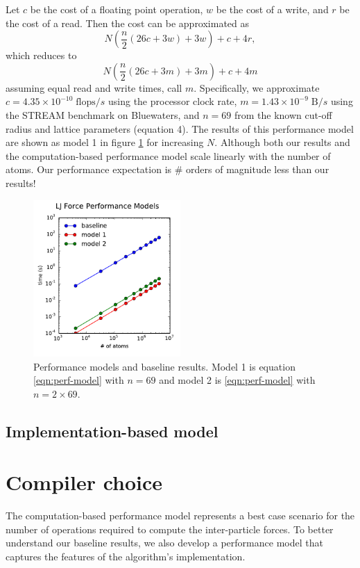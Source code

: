 \documentclass[12pt]{article}
\begin{document}
\noindent Let $c$ be the cost of a floating point operation, $w$ be the cost of a write, 
and $r$ be the cost of a read. Then the cost can be approximated as
\begin{equation}
    N \left(\frac{n}{2} \left(26 c + 3 w\right) + 3 w\right) + c + 4 r,
\end{equation}
which reduces to
\begin{equation}
  N \left(\frac{n}{2} \left(26 c + 3 m\right) + 3 m\right) + c + 4 m
  \label{eqn:perf-model}
\end{equation}
assuming equal read and write times, call $m$. Specifically, we approximate
$c = 4.35\times10^{-10}\;\text{flops}/s$ using the processor clock rate, 
$m = 1.43\times10^{-9}\;\text{B}/s$ using the STREAM benchmark on Bluewaters,
and $n = 69$ from the known cut-off radius and lattice parameters (equation 4).
The results of this performance model are shown as model 1 in figure 
\ref{fig:perf-models} for increasing $N$. Although both our results and the 
computation-based performance model scale linearly with the number of atoms. 
Our performance expectation is \# orders of magnitude less than our results!

\begin{figure}[h!]
  \centering
  \includegraphics[width=0.5\textwidth]{../figs/perfmodel_forceLJ}
  \caption{Performance models and baseline results. Model 1 is
    equation \ref{eqn:perf-model} with $n=69$ and model 2 is
    \ref{eqn:perf-model} with $n=2\times69$.}
  \label{fig:perf-models}
\end{figure}
\noindent 

\subsection{Implementation-based model}
\section{Compiler choice}
The computation-based performance model represents a best case scenario 
for the number of operations required to compute the inter-particle forces. 
To better understand our baseline results, we also develop a performance model 
that captures the features of the algorithm's implementation. \\
\end{document}

